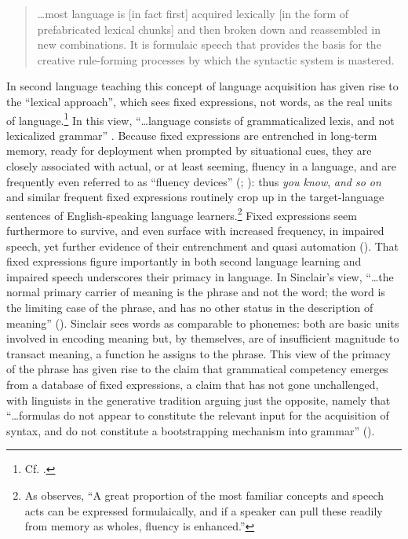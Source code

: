 \documentclass[output=paper]{langsci/langscibook}
\begin{document}
\begin{quote}
    …most language is [in fact first] acquired lexically [in the form of prefabricated lexical chunks] and then broken down and reassembled in new combinations. It is formulaic speech that provides the basis for the creative rule-forming processes by which the syntactic system is mastered. \citep[174]{mackenzie_improvisation_2000}
\end{quote}

In second language teaching this concept of language acquisition has given rise to the ``lexical approach'', which sees fixed expressions, not words, as the real units of language.\footnote{Cf. \citealt{lewis_lexical_1993}.} In this view, “…language consists of grammaticalized lexis, and not lexicalized grammar” \citep[63]{MacKenzie2000b}. Because fixed expressions are entrenched in long-term memory, ready for deployment when prompted by situational cues, they are closely associated with actual, or at least seeming, fluency in a language, and are frequently even referred to as ``fluency devices'' (\citealt[174]{mackenzie_improvisation_2000}; \citealt[3]{wood_formulaic_2002}): thus \textit{you know}, \textit{and so on} and similar frequent fixed expressions routinely crop up in the target-language sentences of English-speaking language learners.\footnote{As \citet[7]{wood_formulaic_2002} observes, “A great proportion of the most familiar concepts and speech acts can be expressed formulaically, and if a speaker can pull these readily from memory as wholes, fluency is enhanced.”} Fixed expressions seem furthermore to survive, and even surface with increased frequency, in impaired speech, yet further evidence of their entrenchment and quasi automation (\citealt[xxiv]{granger_phraseology:_2008}). That fixed expressions figure importantly in both second language learning and impaired speech underscores their primacy in language. In Sinclair’s view, “…the normal primary carrier of meaning is the phrase and not the word; the word is the limiting case of the phrase, and has no other status in the description of meaning” (\citeyear[409]{granger_phrase_2008}). Sinclair sees words as comparable to phonemes: both are basic units involved in encoding meaning but, by themselves, are of insufficient magnitude to transact meaning, a function he assigns to the phrase. This view of the primacy of the phrase has given rise to the claim that grammatical competency emerges from a database of fixed expressions, a claim that has not gone unchallenged, with linguists in the generative tradition arguing just the opposite, namely that “…formulas do not appear to constitute the relevant input for the acquisition of syntax, and do not constitute a bootstrapping mechanism into grammar” (\citealt[85]{bardovi-harlig_unconventional_2017}).
\end{document}

